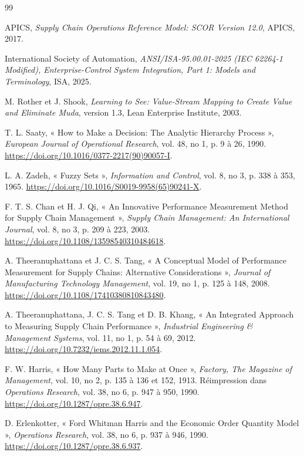 \renewcommand{\bibname}{Références}
\begin{thebibliography}{99}

APICS, \emph{Supply Chain Operations Reference Model: SCOR Version 12.0}, APICS, 2017.

International Society of Automation, \emph{ANSI/ISA-95.00.01-2025 (IEC 62264-1 Modified), Enterprise-Control System Integration, Part 1: Models and Terminology}, ISA, 2025.

M. Rother et J. Shook, \emph{Learning to See: Value-Stream Mapping to Create Value and Eliminate Muda}, version 1.3, Lean Enterprise Institute, 2003.

T. L. Saaty, « How to Make a Decision: The Analytic Hierarchy Process », \emph{European Journal of Operational Research}, vol. 48, no 1, p. 9 à 26, 1990. \url{https://doi.org/10.1016/0377-2217(90)90057-I}.

L. A. Zadeh, « Fuzzy Sets », \emph{Information and Control}, vol. 8, no 3, p. 338 à 353, 1965. \url{https://doi.org/10.1016/S0019-9958(65)90241-X}.

F. T. S. Chan et H. J. Qi, « An Innovative Performance Measurement Method for Supply Chain Management », \emph{Supply Chain Management: An International Journal}, vol. 8, no 3, p. 209 à 223, 2003. \url{https://doi.org/10.1108/13598540310484618}.

A. Theeranuphattana et J. C. S. Tang, « A Conceptual Model of Performance Measurement for Supply Chains: Alternative Considerations », \emph{Journal of Manufacturing Technology Management}, vol. 19, no 1, p. 125 à 148, 2008. \url{https://doi.org/10.1108/17410380810843480}.

A. Theeranuphattana, J. C. S. Tang et D. B. Khang, « An Integrated Approach to Measuring Supply Chain Performance », \emph{Industrial Engineering \& Management Systems}, vol. 11, no 1, p. 54 à 69, 2012. \url{https://doi.org/10.7232/iems.2012.11.1.054}.

F. W. Harris, « How Many Parts to Make at Once », \emph{Factory, The Magazine of Management}, vol. 10, no 2, p. 135 à 136 et 152, 1913. Réimpression dans \emph{Operations Research}, vol. 38, no 6, p. 947 à 950, 1990. \url{https://doi.org/10.1287/opre.38.6.947}.

D. Erlenkotter, « Ford Whitman Harris and the Economic Order Quantity Model », \emph{Operations Research}, vol. 38, no 6, p. 937 à 946, 1990. \url{https://doi.org/10.1287/opre.38.6.937}.

\end{thebibliography}
